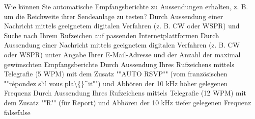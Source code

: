     {Wie können Sie automatische Empfangsberichte zu Aussendungen erhalten, z. B. um die Reichweite ihrer Sendeanlage zu testen?}
    {Durch Aussendung einer Nachricht mittels geeignetem digitalen Verfahren (z. B. CW oder WSPR) und Suche nach Ihrem Rufzeichen auf passenden Internetplattformen}
    {Durch Aussendung einer Nachricht mittels geeignetem digitalen Verfahren (z. B. CW oder WSPR) unter Angabe Ihrer E-Mail-Adresse und der Anzahl der maximal gewünschten Empfangsberichte}
    {Durch Aussendung Ihres Rufzeichens mittels Telegrafie (5 WPM) mit dem Zusatz ""AUTO RSVP"" (vom französischen ""répondez s'il vous pla\textbackslash\{\}\textasciicircum{}it"") und Abhören der 10 kHz höher gelegenen Frequenz}
    {Durch Aussendung Ihres Rufzeichens mittels Telegrafie (12 WPM) mit dem Zusatz ""R"" (für Report) und Abhören der 10 kHz tiefer gelegenen Frequenz}
    {false}{false}